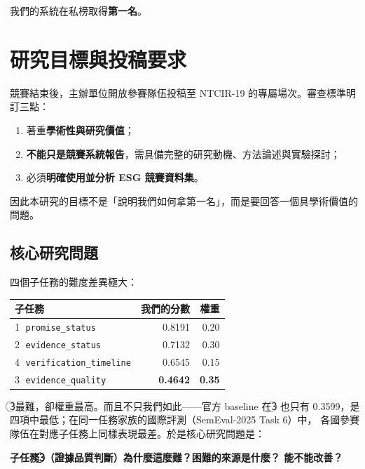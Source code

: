 \documentclass[11pt,a4paper]{ctexart}
\newcommand{\fieldname}[1]{\texttt{#1}}
\begin{document}
我們的系統在私榜取得\textbf{第一名}。

\section{研究目標與投稿要求}

競賽結束後，主辦單位開放參賽隊伍投稿至 NTCIR-19 的專屬場次。審查標準明訂三點：
\begin{enumerate}[leftmargin=2em, itemsep=1pt]
  \item 著重\textbf{學術性與研究價值}；
  \item \textbf{不能只是競賽系統報告}，需具備完整的研究動機、方法論述與實驗探討；
  \item 必須\textbf{明確使用並分析 ESG 競賽資料集}。
\end{enumerate}

因此本研究的目標不是「說明我們如何拿第一名」，而是要回答一個具學術價值的問題。

\subsection{核心研究問題}

四個子任務的難度差異極大：

\begin{table}[h]
\centering
\small
\begin{tabular}{@{}lrr@{}}
\toprule
子任務 & 我們的分數 & 權重 \\
\midrule
\textcircled{1} \fieldname{promise\_status}        & 0.8191 & 0.20 \\
\textcircled{2} \fieldname{evidence\_status}       & 0.7132 & 0.30 \\
\textcircled{4} \fieldname{verification\_timeline} & 0.6545 & 0.15 \\
\rowcolor{yellow!20}
\textcircled{3} \fieldname{evidence\_quality}      & \textbf{0.4642} & \textbf{0.35} \\
\bottomrule
\end{tabular}
\end{table}

\noindent\textcircled{3}最難，卻權重最高。而且不只我們如此——官方 baseline 在\textcircled{3}
也只有 0.3599，是四項中最低；在同一任務家族的國際評測（SemEval-2025 Task 6）中，
各國參賽隊伍在對應子任務上同樣表現最差。於是核心研究問題是：

\begin{tcolorbox}[colback=blue!5, colframe=blue!50]
\textbf{子任務\textcircled{3}（證據品質判斷）為什麼這麼難？困難的來源是什麼？
能不能改善？}
\end{tcolorbox}
\end{document}
